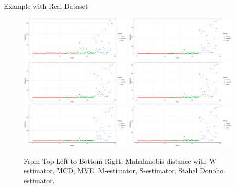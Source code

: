 \documentclass[10pt,xcolor=svgnames]{beamer} %
\begin{document}
\begin{frame}{Example with Real Dataset}
    \begin{figure}
        \centering
        \includegraphics[width = 0.49\textwidth]{images/Distance-winsor.png}
        \includegraphics[width = 0.49\textwidth]{images/Distance-mcd.png}
        \includegraphics[width = 0.49\textwidth]{images/Distance-mve.png}
        \includegraphics[width = 0.49\textwidth]{images/Distance-Mest.png}
        \includegraphics[width = 0.49\textwidth]{images/Distance-Sest.png}
        \includegraphics[width = 0.49\textwidth]{images/Distance-sde.png}
        \caption{From Top-Left to Bottom-Right: Mahalanobis distance with W-estimator, MCD, MVE, M-estimator, S-estimator, Stahel Donoho estimator.}
    \end{figure}
\end{frame}
\end{document}
